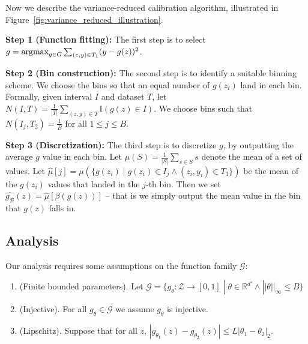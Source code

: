 Now we describe the variance-reduced calibration algorithm, illustrated in Figure~\ref{fig:variance_reduced_illustration}.


\textbf{Step 1 (Function fitting):} The first step is to select $g = \mathop{\mbox{argmax}}_{g \in G} \sum_{(z, y) \in T_1} (y - g(z))^2$.

\textbf{Step 2 (Bin construction):} The second step is to identify a suitable binning scheme. We choose the bins so that an equal number of $g(z_i)$ land in each bin. Formally, given interval $I$ and dataset $T$, let $N(I, T) = \frac{1}{|T|}\sum_{(z, y) \in T} \mathbb{I}(g(z) \in I)$. We choose bins such that $N(I_j, T_2) = \frac{1}{B}$ for all $1 \leq j \leq B$. 

\textbf{Step 3 (Discretization):} The third step is to discretize $g$, by outputting the average $g$ value in each bin. Let $\mu(S) = \frac{1}{|S|} \sum_{s \in S} s$ denote the mean of a set of values.
Let $\hat{\mu}[j] = \mu(\{ g(z_i) \; | \; g(z_i) \in I_j \wedge (z_i, y_i) \in T_3 \})$ be the mean of the $g(z_i)$ values that landed in the $j$-th bin.
Then we set $\hat{g_{\mathcal{B}}}(z) = \hat{\mu}[\beta(g(z))]$ -- that is we simply output the mean value in the bin that $g(z)$ falls in.

\subsection{Analysis}



Our analysis requires some assumptions on the function family $\mathcal{G}$:
\begin{enumerate}
\item (Finite bounded parameters). Let $\mathcal{G} = \{ g_{\theta} : \mathcal{Z} \to [0, 1] \; | \; \theta \in \mathbb{R}^{d'} \wedge ||\theta||_{\infty} \leq B \}$
\item (Injective). For all $g_{\theta} \in \mathcal{G}$ we assume $g_{\theta}$ is injective.
\item (Lipschitz). Suppose that for all $z$, $|g_{\theta_1}(z) - g_{\theta_2}(z)| \leq L|\theta_1 - \theta_2|_2$.
\end{enumerate}

